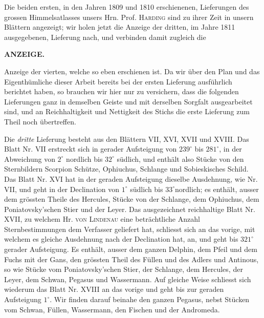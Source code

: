 Die beiden ersten, in den Jahren 1809 und 1810 erschienenen, Lieferungen des grossen Himmelsatlasses unsers Hrn. Prof. \textsc{Harding} sind zu ihrer Zeit in unsern Blättern angezeigt; wir holen jetzt die Anzeige der dritten, im Jahre 1811 ausgegebenen, Lieferung nach, und verbinden damit zugleich die\par
{}
\clearpage
\noindent{}%
%
\parbox[t]{\dimexpr\linewidth-24mm\relax}{\centering\footnotesize\bfseries ANZEIGE.\par}%
\makebox[12mm][r]{}\par\nobreak\medskip
\noindent Anzeige der vierten, welche so eben erschienen ist. Da wir über den Plan und das Eigenthümliche dieser Arbeit bereits bei der ersten Lieferung ausführlich berichtet haben, so brauchen wir hier nur zu versichern, dass die folgenden Lieferungen ganz in demselben Geiste und mit derselben Sorgfalt ausgearbeitet sind, und an Reichhaltigkeit und Nettigkeit des Stichs die erste Lieferung zum Theil noch übertreffen.

Die \emph{dritte} Lieferung besteht aus den Blättern VII, XVI, XVII und XVIII. Das Blatt Nr. VII erstreckt sich in gerader Aufsteigung von $239^\circ$ bis $281^\circ$, in der Abweichung von $2^\circ$ nordlich bis $32^\circ$ südlich, und enthält also Stücke von den Sternbildern Scorpion Schütze, Ophiuchus, Schlange und Sobieskisches Schild. Das Blatt Nr. XVI hat in der geraden Aufsteigung dieselbe Ausdehnung, wie Nr. VII, und geht in der Declination von $1^\circ$ südlich bis $33^\circ$nordlich; es enthält, ausser dem grössten Theile des Hercules, Stücke von der Schlange, dem Ophiuchus, dem Poniatovsky'schen Stier und der Leyer. Das ausgezeichnet reichhaltige Blatt Nr. XVII, zu welchem Hr. \textsc{von Lindenau} eine beträchtliche Anzahl Sternbestimmungen dem Verfasser geliefert hat, schliesst sich an das vorige, mit welchem es gleiche Ausdehnung nach der Declination hat, an, und geht bis $321^\circ$ gerader Aufsteigung. Es enthält, ausser dem ganzen Delphin, dem Pfeil und dem Fuchs mit der Gans, den grössten Theil des Füllen und des Adlers und Antinous, so wie Stücke vom Poniatovsky'schen Stier, der Schlange, dem Hercules, der Leyer, dem Schwan, Pegasus und Wassermann. Auf gleiche Weise schliesst sich wiederum das Blatt Nr. XVIII an das vorige und geht bis zur geraden Aufsteigung $1^\circ$. Wir finden darauf beinahe den ganzen Pegasus, nebst Stücken vom Schwan, Füllen, Wassermann, den Fischen und der Andromeda.

